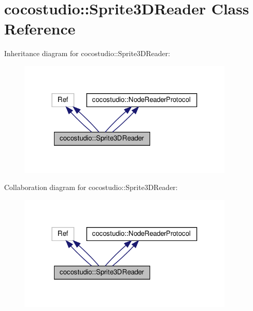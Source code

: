 \hypertarget{classcocostudio_1_1Sprite3DReader}{}\section{cocostudio\+:\+:Sprite3\+D\+Reader Class Reference}
\label{classcocostudio_1_1Sprite3DReader}


Inheritance diagram for cocostudio\+:\+:Sprite3\+D\+Reader\+:
\nopagebreak
\begin{figure}[H]
\begin{center}
\leavevmode
\includegraphics[width=292pt]{classcocostudio_1_1Sprite3DReader__inherit__graph}
\end{center}
\end{figure}


Collaboration diagram for cocostudio\+:\+:Sprite3\+D\+Reader\+:
\nopagebreak
\begin{figure}[H]
\begin{center}
\leavevmode
\includegraphics[width=292pt]{classcocostudio_1_1Sprite3DReader__coll__graph}
\end{center}
\end{figure}
